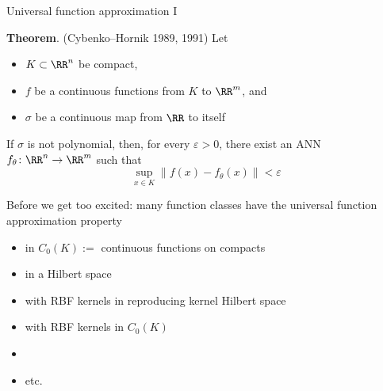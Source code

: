 \documentclass[xcolor=dvipsnames, 10pt]{beamer}
\begin{document}
\begin{frame}{Universal function approximation I}

    \textbf{Theorem}. (Cybenko--Hornik 1989, 1991) Let 
    \begin{itemize}
        \item $K \subset \RR^n$ be compact, 
        \item $f$ be a continuous functions from $K$ to $\RR^m$, and
        \item $\sigma$ be a continuous map from $\RR$ to itself
    \end{itemize}

    \medskip
    If $\sigma$ is not polynomial, then, for every $\varepsilon > 0$, 
    there exist an ANN $f_\theta \colon \RR^n \to \RR^m$  such that
    \begin{equation*}
        \sup_{x \in K} \left\| f(x) - f_\theta(x) \right\| 
        < \varepsilon
    \end{equation*}

\end{frame}


\begin{frame}
    
    Before we get too excited: many function classes have the universal function
    approximation property

            \vspace{0.4em}
    \begin{itemize}
        \item {} in $C_0(K) :=$ continuous functions on compacts 
            \vspace{0.4em}
        \item {} in a Hilbert space
            \vspace{0.4em}
        \item {} with RBF kernels in reproducing kernel Hilbert space
            \vspace{0.4em}
        \item {} with RBF kernels in $C_0(K)$
            \vspace{0.4em}
        \item {}
            \vspace{0.4em}
        \item etc.
    \end{itemize}

\end{frame}
\end{document}
